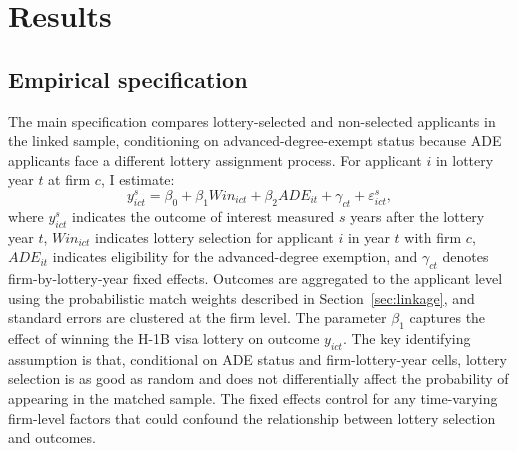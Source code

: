 \section{Results}
\label{sec:results}

\subsection{Empirical specification}

The main specification compares lottery-selected and non-selected applicants in the linked sample, conditioning on advanced-degree-exempt status because ADE applicants face a different lottery assignment process. For applicant $i$ in lottery year $t$ at firm $c$, I estimate:
\begin{equation}
\label{eq:mainreg}
 y_{ict}^s = \beta_0 + \beta_1 Win_{ict} + \beta_2 ADE_{it} + \gamma_{ct} + \varepsilon_{ict}^s,
\end{equation}
where $y_{ict}^s$ indicates the outcome of interest measured $s$ years after the lottery year $t$, $Win_{ict}$ indicates lottery selection for applicant $i$ in year $t$ with firm $c$, $ADE_{it}$ indicates eligibility for the advanced-degree exemption, and $\gamma_{ct}$ denotes firm-by-lottery-year fixed effects. Outcomes are aggregated to the applicant level using the probabilistic match weights described in Section~\ref{sec:linkage}, and standard errors are clustered at the firm level. The parameter $\beta_1$ captures the effect of winning the H-1B visa lottery on outcome $y_{ict}$. The key identifying assumption is that, conditional on ADE status and firm-lottery-year cells, lottery selection is as good as random and does not differentially affect the probability of appearing in the matched sample. The fixed effects control for any time-varying firm-level factors that could confound the relationship between lottery selection and outcomes.

